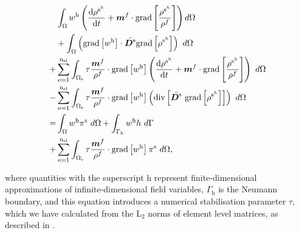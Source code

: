 \begin{equation}
\begin{split}
&\int_{\Omega} w^{\mathrm{h}} \left(
  \frac{\mathrm{d}\rho^{\mathrm{s}^{h}}}{\mathrm{d}t} +
  \mbox{\boldmath$ m$}^f\cdot\mathrm{grad}\left[\frac{
      \rho^{\mathrm{s}^{h}}}{\rho^f}\right] \right)
  d\Omega\\ &+\int_{\Omega} \left( \mathrm{grad}
  \left[w^{\mathrm{h}}\right] \cdot \bar{\mbox{\boldmath$ D$}^\mathrm{s}} \mathrm{grad}
  \left[ \rho^{\mathrm{s}^{h}}\right] \right)\ d\Omega\\ +&
  \sum_{\mathrm{e}=1}^{\mathrm{n_{el}}} \int_{\Omega_{\mathrm{e}}}
  \tau \frac{\mbox{\boldmath$ m$}^{f}}{\rho^f} \cdot \mathrm{grad} \left[w^{\mathrm{h}}\right] \left(
  \frac{\mathrm{d}\rho^{\mathrm{s}^{h}}}{\mathrm{d}t} +
  \mbox{\boldmath$ m$}^f\cdot\mathrm{grad}\left[\frac{
      \rho^{\mathrm{s}^{h}}}{\rho^f}\right] \right) \ d\Omega\\ -&
  \sum_{\mathrm{e}=1}^{\mathrm{n_{el}}} \int_{\Omega_{\mathrm{e}}}
  \tau \frac{\mbox{\boldmath$ m$}^{f}}{\rho^f} \cdot \mathrm{grad} \left[w^{\mathrm{h}}\right]
  \left(\mathrm{div}\left[\bar{\mbox{\boldmath$ D$}^\mathrm{s}}\ \mathrm{grad} \left[
      \rho^{\mathrm{s}^{h}}\right]\right]\right) \ d\Omega\\ = &
  \int_{\Omega} w^{\mathrm{h}} \pi^\mathrm{s} \ d\Omega +
  \int_{\Gamma_{\mathrm{h}}} w^{\mathrm{h}} h \ d\Gamma\\ +&
  \sum_{\mathrm{e}=1}^{\mathrm{n_{el}}} \int_{\Omega_{\mathrm{e}}}
  \tau \frac{\mbox{\boldmath$ m$}^{f}}{\rho^f} \cdot \mathrm{grad} \left[w^{\mathrm{h}}\right]
  \pi^\mathrm{s} \ d\Omega,
\label{stabilizedmassbal}
\end{split}
\end{equation}

\noindent where quantities with the superscript $\mathrm{h}$ represent
finite-di\-men\-sion\-al approximations of infinite-dimensional field
variables, $\Gamma_{\mathrm{h}}$ is the Neumann boundary, and this
equation introduces a numerical stabilisation parameter $\tau$, which
we have calculated from the $\mathrm{L}_{2}$ norms of element level
matrices, as described in
\cite{tezduyarsupg}.


%

